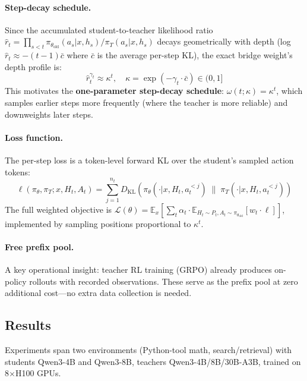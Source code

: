 \documentclass[11pt,a4paper]{article}
\begin{document}
\paragraph{Step-decay schedule.}
Since the accumulated student-to-teacher likelihood ratio $\hat{r}_t = \prod_{s<t} \pi_{\theta_{\text{old}}}(a_s|x,h_s)/\pi_T(a_s|x,h_s)$ decays geometrically with depth (log $\hat{r}_t \approx -(t-1)\bar{c}$ where $\bar{c}$ is the average per-step KL), the exact bridge weight's depth profile is:
\begin{equation}
    \hat{r}_t^{\gamma_t} \approx \kappa^t, \quad \kappa = \exp(-\gamma_t \cdot \bar{c}) \in (0, 1]
\end{equation}
This motivates the \textbf{one-parameter step-decay schedule}: $\omega(t; \kappa) = \kappa^t$, which samples earlier steps more frequently (where the teacher is more reliable) and downweights later steps.

\paragraph{Loss function.}
The per-step loss is a token-level forward KL over the student's sampled action tokens:
\begin{equation}
    \ell(\pi_\theta, \pi_T; x, H_t, A_t) = \sum_{j=1}^{n_t} D_{\text{KL}}\!\left(\pi_\theta(\cdot|x, H_t, a_t^{<j}) \;\|\; \pi_T(\cdot|x, H_t, a_t^{<j})\right)
\end{equation}
The full weighted objective is $\mathcal{L}(\theta) = \mathbb{E}_{x}\left[\sum_t \alpha_t \cdot \mathbb{E}_{H_t \sim P_t, A_t \sim \pi_{\theta_{\text{old}}}} [w_t \cdot \ell]\right]$, implemented by sampling positions proportional to $\kappa^t$.

\paragraph{Free prefix pool.}
A key operational insight: teacher RL training (GRPO) already produces on-policy rollouts with recorded observations. These serve as the prefix pool at zero additional cost---no extra data collection is needed.

\subsection{Results}

Experiments span two environments (Python-tool math, search/retrieval) with students Qwen3-4B and Qwen3-8B, teachers Qwen3-4B/8B/30B-A3B, trained on 8$\times$H100 GPUs.
\end{document}
